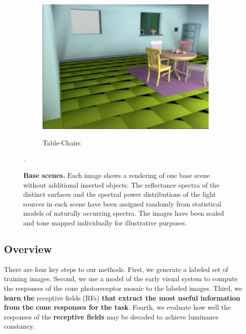\documentclass{jov}
\providecommand{\DIFaddtex}[1]{{\bf #1}} %
\providecommand{\DIFdeltex}[1]{} %
\providecommand{\DIFaddbegin}{} %
\providecommand{\DIFaddend}{} %
\providecommand{\DIFdelbegin}{} %
\providecommand{\DIFdelend}{} %
\providecommand{\DIFadd}[1]{\texorpdfstring{\DIFaddtex{#1}}{#1}} %
\providecommand{\DIFdel}[1]{\texorpdfstring{\DIFdeltex{#1}}{}} %
\newcommand{\DIFscaledelfig}{0.5}
\newlength{\DIFdelgraphicswidth} %
\newlength{\DIFdelgraphicsheight} %
\newcommand{\DIFaddincludegraphics}[2][]{{\color{blue}\fbox{\DIFOincludegraphics[#1]{#2}}}} %
\newcommand{\DIFdelincludegraphics}[2][]{%
\sbox{\DIFdelgraphicsbox}{\DIFOincludegraphics[#1]{#2}}%
\settoboxwidth{\DIFdelgraphicswidth}{\DIFdelgraphicsbox} %
\settoboxtotalheight{\DIFdelgraphicsheight}{\DIFdelgraphicsbox} %
\scalebox{\DIFscaledelfig}{%
\parbox[b]{\DIFdelgraphicswidth}{\usebox{\DIFdelgraphicsbox}\\[-\baselineskip] \rule{\DIFdelgraphicswidth}{0em}}\llap{\resizebox{\DIFdelgraphicswidth}{\DIFdelgraphicsheight}{%
\setlength{\unitlength}{\DIFdelgraphicswidth}%
\begin{picture}(1,1)%
\thicklines\linethickness{2pt} %
{\color[rgb]{1,0,0}\put(0,0){\framebox(1,1){}}}%
{\color[rgb]{1,0,0}\put(0,0){\line( 1,1){1}}}%
{\color[rgb]{1,0,0}\put(0,1){\line(1,-1){1}}}%
\end{picture}%
}\hspace*{3pt}}} %
} %
\DeclareRobustCommand{\DIFaddbegin}{\DIFOaddbegin \let\includegraphics\DIFaddincludegraphics} %
\DeclareRobustCommand{\DIFaddend}{\DIFOaddend \let\includegraphics\DIFOincludegraphics} %
\DeclareRobustCommand{\DIFdelbegin}{\DIFOdelbegin \let\includegraphics\DIFdelincludegraphics} %
\DeclareRobustCommand{\DIFdelend}{\DIFOaddend \let\includegraphics\DIFOincludegraphics} %
\begin{document}
\begin{figure}
\begin{subfigure}[b]{0.22 \textwidth}
        \label{fig:baseSceneMill}
    \end{subfigure}    
    ~
    \begin{subfigure}[b]{0.22 \textwidth}
        \caption{Table-Chairs}    
        \includegraphics[width=\textwidth]{../FiguresDraft5/Figure2/Figure2_c.pdf}
        \label{fig:baseSceneTableChairs}
    \end{subfigure}
    \caption{{\bf Base scenes.} Each image shows a rendering of one base scene without additional inserted objects.  The reflectance spectra of the distinct surfaces and the spectral power distributions of the light sources in each scene have been assigned randomly from statistical models of naturally occurring spectra. The images have been scaled and tone mapped individually for illustrative purposes.}
\label{fig:baseScenes}. \end{figure}

\subsection{Overview}
There are four key steps to our methods.  First, we generate a labeled set of training images.  Second, we use a model of the early visual system to compute the responses of the cone photoreceptor mosaic to the labeled images. Third, we \DIFdelbegin \DIFdel{apply AMA to the cone responses, as well as to a contrast normalized version of the cone responses, to learn task-optimal }\DIFdelend \DIFaddbegin \DIFadd{learn the }\DIFaddend receptive fields (RFs) \DIFaddbegin \DIFadd{that extract the most useful information from the cone responses for the task}\DIFaddend . Fourth, we evaluate how well the responses of the \DIFdelbegin \DIFdel{RFs }\DIFdelend \DIFaddbegin \DIFadd{receptive fields }\DIFaddend may be decoded to achieve luminance constancy.
\end{document}
